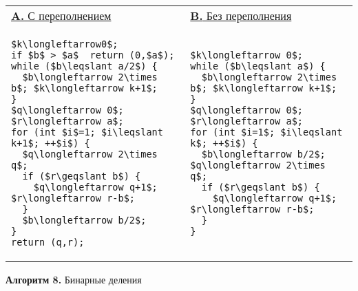 \begin{center}
\begin{tabular}{|l|l|}
\hline
\hspace*{28pt}\underline{\textbf{A.} С переполнением}
&
\hspace*{23pt}\underline{\textbf{B.} Без переполнения}\\
{\begin{lstlisting}[mathescape=true, frame=none]
$k\longleftarrow0$;
if $b$ > $a$  return (0,$a$);
while ($b\leqslant a/2$) {
  $b\longleftarrow 2\times b$; $k\longleftarrow k+1$;
}
$q\longleftarrow 0$; $r\longleftarrow a$;
for (int $i$=1; $i\leqslant k+1$; ++$i$) {
  $q\longleftarrow 2\times q$;
  if ($r\geqslant b$) {
    $q\longleftarrow q+1$; $r\longleftarrow r-b$;
  }
  $b\longleftarrow b/2$;
}
return (q,r);
\end{lstlisting}}
&
{\begin{lstlisting}[mathescape=true, frame=none]
$k\longleftarrow 0$;
while ($b\leqslant a$) {
  $b\longleftarrow 2\times b$; $k\longleftarrow k+1$;
}
$q\longleftarrow 0$; $r\longleftarrow a$;
for (int $i=1$; $i\leqslant k$; ++$i$) {
  $b\longleftarrow b/2$; $q\longleftarrow 2\times q$;
  if ($r\geqslant b$) {
    $q\longleftarrow q+1$; $r\longleftarrow r-b$;
  }
}
\end{lstlisting}}\\
\hline
\end{tabular}
\end{center}
\begin{center}
\textbf{Алгоритм 8.} Бинарные деления
\end{center}
\newpage


